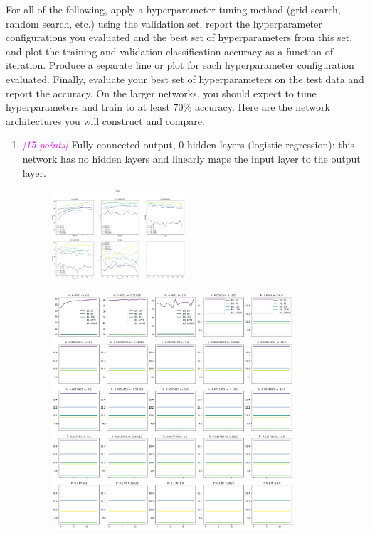 \documentclass{article}
\newcommand{\1}{\mathbf{1}}
\newcommand{\points}[1]{\small\textcolor{magenta}{\emph{[#1 points]}} \normalsize}
\begin{document}
For all of the following, apply a hyperparameter tuning method (grid search, random search, etc.) using the validation set, report the hyperparameter configurations you evaluated and the best set of hyperparameters from this set, and plot the training and validation classification accuracy as a function of iteration. Produce a separate line or plot for each hyperparameter configuration  evaluated.  Finally, evaluate your best set of hyperparameters on the test data and report the accuracy. On the larger networks, you should expect to tune hyperparameters and train to at least 70\% accuracy. Here are the network architectures you will construct and compare.
\begin{enumerate}
    \item \points{15} Fully-connected output, 0 hidden layers (logistic regression): this network has no hidden layers and linearly maps the input layer to the output layer.
    \begin{figure}[h!]
        \centering 
        \includegraphics[width=0.47\textwidth]{HW4/HW4_plots/A5a.png}
    \end{figure}
    \begin{figure}
    \centering
        \includegraphics[width=0.85\textwidth]{HW4/HW4_plots/A5a1.png}

\end{figure}
\end{enumerate}
\end{document}
